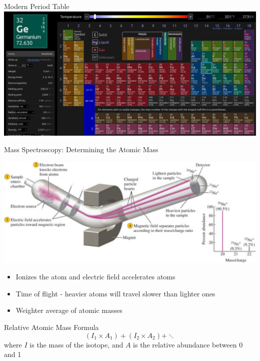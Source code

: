 \documentclass[11pt]{beamer}
\begin{document}
\begin{frame}{Modern Period Table}
  \centering
  \includegraphics[width=\linewidth]{ptable}
\end{frame}

\begin{frame}{Mass Spectroscopy: Determining the Atomic Mass}
  \begin{center}
    \includegraphics[width=\linewidth]{mass_spect}
  \end{center}

  \begin{itemize}
  \item Ionizes the atom and electric field accelerates atoms
  \item Time of flight - heavier atoms will travel slower
    than lighter ones
  \item Weighter average of atomic masses
  \end{itemize}
\end{frame}

\begin{frame}{Relative Atomic Mass Formula}
  \begin{equation}
    (I_1\times A_1) + (I_2\times A_2) + \ddots
  \end{equation}
  where $I$ is the mass of the isotope, and $A$ is the
  relative abundance between 0 and 1
\end{frame}
\end{document}
